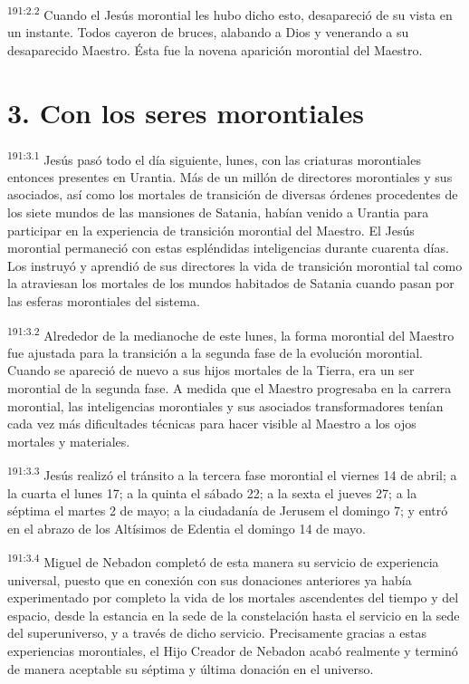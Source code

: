 \par
\textsuperscript{191:2.2} Cuando el Jesús morontial les hubo dicho esto, desapareció de su vista en un instante. Todos cayeron de bruces, alabando a Dios y venerando a su desaparecido Maestro. Ésta fue la novena aparición morontial del Maestro.

\section*{3. Con los seres morontiales}
\par
\textsuperscript{191:3.1} Jesús pasó todo el día siguiente, lunes, con las criaturas morontiales entonces presentes en Urantia. Más de un millón de directores morontiales y sus asociados, así como los mortales de transición de diversas órdenes procedentes de los siete mundos de las mansiones de Satania, habían venido a Urantia para participar en la experiencia de transición morontial del Maestro. El Jesús morontial permaneció con estas espléndidas inteligencias durante cuarenta días. Los instruyó y aprendió de sus directores la vida de transición morontial tal como la atraviesan los mortales de los mundos habitados de Satania cuando pasan por las esferas morontiales del sistema.

\par
\textsuperscript{191:3.2} Alrededor de la medianoche de este lunes, la forma morontial del Maestro fue ajustada para la transición a la segunda fase de la evolución morontial. Cuando se apareció de nuevo a sus hijos mortales de la Tierra, era un ser morontial de la segunda fase. A medida que el Maestro progresaba en la carrera morontial, las inteligencias morontiales y sus asociados transformadores tenían cada vez más dificultades técnicas para hacer visible al Maestro a los ojos mortales y materiales.

\par
\textsuperscript{191:3.3} Jesús realizó el tránsito a la tercera fase morontial el viernes 14 de abril; a la cuarta el lunes 17; a la quinta el sábado 22; a la sexta el jueves 27; a la séptima el martes 2 de mayo; a la ciudadanía de Jerusem el domingo 7; y entró en el abrazo de los Altísimos de Edentia el domingo 14 de mayo.

\par
\textsuperscript{191:3.4} Miguel de Nebadon completó de esta manera su servicio de experiencia universal, puesto que en conexión con sus donaciones anteriores ya había experimentado por completo la vida de los mortales ascendentes del tiempo y del espacio, desde la estancia en la sede de la constelación hasta el servicio en la sede del superuniverso, y a través de dicho servicio. Precisamente gracias a estas experiencias morontiales, el Hijo Creador de Nebadon acabó realmente y terminó de manera aceptable su séptima y última donación en el universo.

